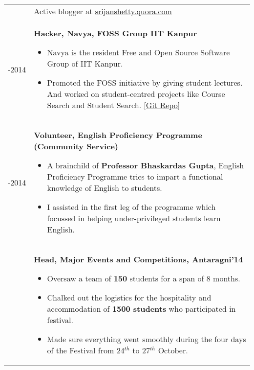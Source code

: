 \documentclass[a4paper,10pt]{article} %
\newcommand{\itemlist}[1]{
    \begin{tabular}{>{\raggedleft}p{2.2cm}p{17cm}}
        #1
    \end{tabular}
}
\begin{document}
\itemlist{
    ---   & Active blogger at \href{srijanshetty.quora.com} {srijanshetty.quora.com} \\

    2013-2014    & \textbf{Hacker, Navya, FOSS Group IIT Kanpur}
                   \footnotesize{
                       \begin{itemize}[leftmargin=*]
                           \item Navya is the resident Free and Open Source Software Group of IIT Kanpur.
                           \item Promoted the FOSS initiative by giving student lectures.
                               And worked on student-centred projects like Course Search and Student Search.
                               \href{https://github.com/navya} {[Git Repo]}
                       \end{itemize}
                   }\\

                   2013-2014    & \textbf{Volunteer, English Proficiency Programme (Community Service)}
                   \footnotesize{
                       \begin{itemize}[leftmargin=*]
                           \item A brainchild of \textbf{Professor Bhaskardas Gupta}, English Proficiency
                               Programme tries to impart a functional knowledge of English to students.
                           \item I assisted in the first leg of the programme which focussed in helping
                               under-privileged students learn English.
                       \end{itemize}
                   }\\

    2014 & \textbf{Head, Major Events and Competitions, Antaragni'14}
           \footnotesize{
               \begin{itemize}[leftmargin=*]
                   \item Oversaw a team of \textbf{150} students for a span of 8 months.
                   \item Chalked out the logistics for the hospitality and accommodation of \textbf{1500 students} who
                       participated in festival.
                   \item Made sure everything went smoothly during the four days of the Festival from 24$^{th}$
                       to 27$^{th}$ October.
               \end{itemize}
           }\\

}
\end{document}
